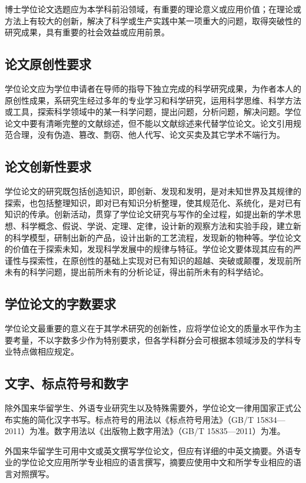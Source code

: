 {博士学位论文选题应为本学科前沿领域，有重要的理论意义或应用价值；在理论或方法上有较大的创新，解决了科学或生产实践中某一项重大的问题，取得突破性的研究成果，具有重要的社会效益或应用前景。

\subsection{论文原创性要求}

学位论文应为学位申请者在导师的指导下独立完成的科学研究成果，为作者本人的原创性成果，系研究生经过多年的专业学习和科学研究，运用科学思维、科学方法或工具，探索科学领域中的某一科学问题，提出问题，分析问题，解决问题。学位论文中要有清晰完整的文献综述，但不能以文献综述来代替学位论文。论文引用规范合理，没有伪造、篡改、剽窃、他人代写、论文买卖及其它学术不端行为。

\subsection{论文创新性要求}

学位论文的研究既包括创造知识，即创新、发现和发明，是对未知世界及其规律的探索，也包括整理知识，即对已有知识分析整理，使其规范化、系统化，是对已有知识的传承。创新活动，贯穿了学位论文研究与写作的全过程，如提出新的学术思想、科学概念、假说、学说、定理、定律，设计新的观察方法和实验手段，建立新的科学模型，研制出新的产品，设计出新的工艺流程，发现新的物种等。学位论文的价值在于探索未知，发现科学发展中的规律与特征。学位论文要体现其应有的严谨性与探索性，在原创性的基础上实现对已有知识的超越、突破或颠覆，发现前所未有的科学问题，提出前所未有的分析论证，得出前所未有的科学结论。

\subsection{学位论文的字数要求}
学位论文最重要的意义在于其学术研究的创新性，应将学位论文的质量水平作为主要考量，不以字数多少作为特别要求，但各学科群分会可根据本领域涉及的学科专业特点做相应规定。

\subsection{文字、标点符号和数字}

除外国来华留学生、外语专业研究生以及特殊需要外，学位论文一律用国家正式公布实施的简化汉字书写。标点符号的用法以《标点符号用法》（GB/T 15834—2011）为准。数字用法以《出版物上数字用法》（GB/T 15835—2011）为准。

外国来华留学生可用中文或英文撰写学位论文，但应有详细的中英文摘要。外语专业的学位论文应用所学专业相应的语言撰写，摘要应使用中文和所学专业相应的语言对照撰写。

}
